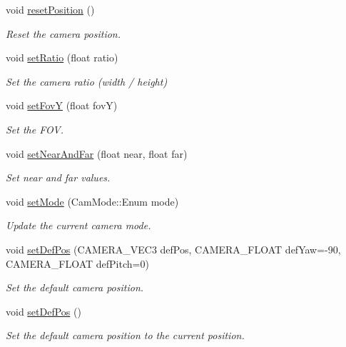 \begin{DoxyCompactItemize}
\mbox{\label{class_camera_ac59fb0da1e1cb188063ce8cf227d3a2f}} 
void \hyperlink{class_camera_ac59fb0da1e1cb188063ce8cf227d3a2f}{reset\+Position} ()
\begin{DoxyCompactList}\small\item\em Reset the camera position. \end{DoxyCompactList}\item 
void \hyperlink{class_camera_a2ddcff55d196d1c57a3310d9c6119f95}{set\+Ratio} (float ratio)
\begin{DoxyCompactList}\small\item\em Set the camera ratio (width / height) \end{DoxyCompactList}\item 
void \hyperlink{class_camera_a3138aa2e40815013739ddb71502ca608}{set\+FovY} (float fovY)
\begin{DoxyCompactList}\small\item\em Set the F\+OV. \end{DoxyCompactList}\item 
void \hyperlink{class_camera_afcb04b0f02749e07b61e3346d34834da}{set\+Near\+And\+Far} (float near, float far)
\begin{DoxyCompactList}\small\item\em Set near and far values. \end{DoxyCompactList}\item 
void \hyperlink{class_camera_a90617e4799a43f0b74ede1d6caca958e}{set\+Mode} (Cam\+Mode\+::\+Enum mode)
\begin{DoxyCompactList}\small\item\em Update the current camera mode. \end{DoxyCompactList}\item 
void \hyperlink{class_camera_aa83a6e3f89b6a1bdd4578d4cd84fdfde}{set\+Def\+Pos} (C\+A\+M\+E\+R\+A\+\_\+\+V\+E\+C3 def\+Pos, C\+A\+M\+E\+R\+A\+\_\+\+F\+L\+O\+AT def\+Yaw=-\/90, C\+A\+M\+E\+R\+A\+\_\+\+F\+L\+O\+AT def\+Pitch=0)
\begin{DoxyCompactList}\small\item\em Set the default camera position. \end{DoxyCompactList}\item 
\mbox{\label{class_camera_a1e8d069fff363a0d3504714068000654}} 
void \hyperlink{class_camera_a1e8d069fff363a0d3504714068000654}{set\+Def\+Pos} ()
\begin{DoxyCompactList}\small\item\em Set the default camera position to the current position. \end{DoxyCompactList}\item 

\end{DoxyCompactItemize}
